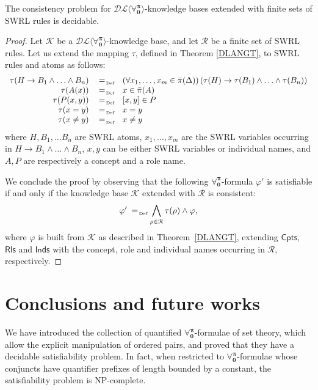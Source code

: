 \documentclass[a4paper,UKenglish]{lipics}
\newcommand{\Lang}{\ensuremath{\mathbf{\forall_{0}^{\pi}}}\xspace}
\newcommand{\nonpairs}[1]{\bar{\pi}(#1)}
\newcommand{\dlLang}{\ensuremath{\mathcal{DL\langle}\Lang\mathcal{\rangle}}\xspace}
\begin{document}
\begin{theorem}
The consistency problem for \dlLang-knowledge bases extended with
finite sets of \textsf{SWRL} rules is decidable.
\end{theorem}
\begin{proof}
Let $\mathcal{K}$ be a \dlLang-knowledge base, and let
$\mathcal{R}$ be a finite set of \textsf{SWRL} rules. Let us extend
the mapping $\tau$, defined in Theorem \ref{DLANGT},
to \textsf{SWRL} rules and atoms as follows:
\[
 \begin{array}{rcl}
  \tau(H \rightarrow B_1 \wedge \ldots \wedge B_n) & \defAs&
  \left(\forall x_1, \ldots, x_m \in \nonpairs{\Delta}\right)\left(\tau(H) \rightarrow \tau(B_1) \wedge \ldots
  \wedge \tau(B_n)\right)\\
%
  \tau(A(x)) & \defAs & x \in \nonpairs{A}\\
%
  \tau(P(x,y)) & \defAs & [x,y] \in P \\
%
  \tau(x=y) & \defAs & x=y\\
%
  \tau(x\neq y) & \defAs & x\neq y\\
 \end{array}
\]
where $H, B_1, \ldots B_n$ are \textsf{SWRL} atoms, $x_1, \ldots, x_m$ are the \textsf{SWRL} variables occurring
in $H \rightarrow B_1 \wedge \ldots \wedge B_n$, $x,y$ can be either \textsf{SWRL} variables or
individual names, and $A,P$ are respectively
a concept and a role name.

We conclude the proof by observing that the following \Lang-formula
$\varphi'$ is satisfiable if and only if the knowledge base
$\mathcal{K}$ extended with $\mathcal{R}$ is consistent:
\[
 \varphi' \defAs \bigwedge\limits_{\rho \in \mathcal{R}}\tau(\rho)
 \wedge \varphi,
\]
where $\varphi$ is built from $\mathcal{K}$ as described in
Theorem~\ref{DLANGT}, extending $\mathsf{Cpts}$, $\mathsf{Rls}$ and
$\mathsf{Inds}$ with the concept, role and individual names occurring
in $\mathcal{R}$, respectively.
\end{proof}

\section{Conclusions and future works}\label{CONCLUSIONS}

We have introduced the collection of quantified \Lang-formulae of set
theory, which allow the explicit manipulation of ordered pairs, and
proved that they have a decidable satisfiability problem.  In fact,
when restricted to \Lang-formulae whose conjuncts have quantifier
prefixes of length bounded by a constant, the satisfiability problem
is \textsc{NP}-complete.
\end{document}
